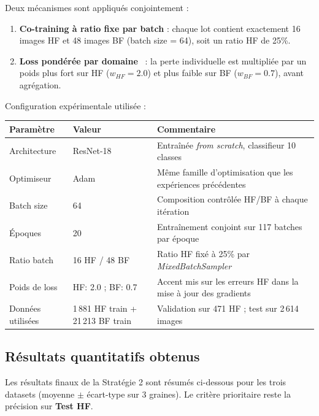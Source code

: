 \documentclass[11pt,a4paper,openany]{book}
\newcommand{\tableheadcolor}{\rowcolor{headerbg}}
\begin{document}
Deux mécanismes sont appliqués conjointement :

\begin{enumerate}
  \item \textbf{Co-training à ratio fixe par batch} : chaque lot contient exactement 16 images HF et 48 images BF (batch size = 64), soit un ratio HF de 25\%.
  \item \textbf{Loss pondérée par domaine}~\cite{ren2018reweight,han2018coteaching} : la perte individuelle est multipliée par un poids plus fort sur HF ($w_{HF}=2.0$) et plus faible sur BF ($w_{BF}=0.7$), avant agrégation.
\end{enumerate}

Configuration expérimentale utilisée :

\vspace{0.6em}
\renewcommand{\arraystretch}{1.45}
\begin{tabularx}{\linewidth}{L{4.1cm} C{3cm} L{7.6cm}}
  \toprule
  \tableheadcolor
  \textbf{Paramètre} & \textbf{Valeur} & \textbf{Commentaire} \\
  \midrule
  Architecture & ResNet-18 & Entraînée \textit{from scratch}, classifieur 10 classes \\
  Optimiseur & Adam & Même famille d'optimisation que les expériences précédentes \\
  Batch size & 64 & Composition contrôlée HF/BF à chaque itération \\
  Époques & 20 & Entraînement conjoint sur 117 batches par époque \\
  Ratio batch & 16 HF / 48 BF & Ratio HF fixé à 25\% par \textit{MixedBatchSampler} \\
  Poids de loss & HF: 2.0 ; BF: 0.7 & Accent mis sur les erreurs HF dans la mise à jour des gradients \\
  Données utilisées & 1\,881 HF train + 21\,213 BF train & Validation sur 471 HF ; test sur 2\,614 images \\
  \bottomrule
\end{tabularx}

\subsection{Résultats quantitatifs obtenus}

Les résultats finaux de la Stratégie 2 sont résumés ci-dessous pour les trois datasets (moyenne $\pm$ écart-type sur 3 graines).
Le critère prioritaire reste la précision sur \textbf{Test HF}.
\end{document}
